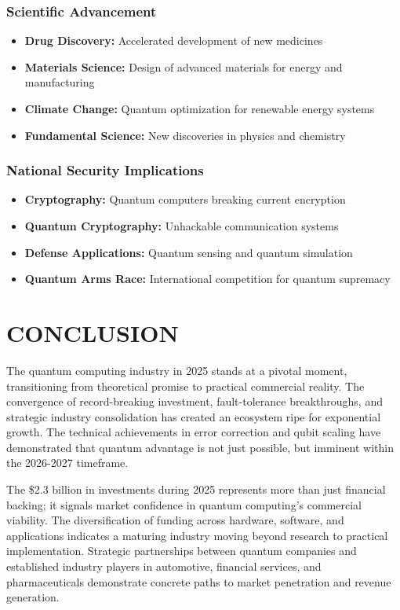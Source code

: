 \documentclass[12pt,a4paper]{article}
\begin{document}
\subsubsection{Scientific Advancement}
\begin{itemize}
    \item \textbf{Drug Discovery:} Accelerated development of new medicines
    \item \textbf{Materials Science:} Design of advanced materials for energy and manufacturing
    \item \textbf{Climate Change:} Quantum optimization for renewable energy systems
    \item \textbf{Fundamental Science:} New discoveries in physics and chemistry
\end{itemize}

\subsubsection{National Security Implications}
\begin{itemize}
    \item \textbf{Cryptography:} Quantum computers breaking current encryption
    \item \textbf{Quantum Cryptography:} Unhackable communication systems
    \item \textbf{Defense Applications:} Quantum sensing and quantum simulation
    \item \textbf{Quantum Arms Race:} International competition for quantum supremacy
\end{itemize}

\section{CONCLUSION}

The quantum computing industry in 2025 stands at a pivotal moment, transitioning from theoretical promise to practical commercial reality. The convergence of record-breaking investment, fault-tolerance breakthroughs, and strategic industry consolidation has created an ecosystem ripe for exponential growth. The technical achievements in error correction and qubit scaling have demonstrated that quantum advantage is not just possible, but imminent within the 2026-2027 timeframe.

The \$2.3 billion in investments during 2025 represents more than just financial backing; it signals market confidence in quantum computing's commercial viability. The diversification of funding across hardware, software, and applications indicates a maturing industry moving beyond research to practical implementation. Strategic partnerships between quantum companies and established industry players in automotive, financial services, and pharmaceuticals demonstrate concrete paths to market penetration and revenue generation.
\end{document}
